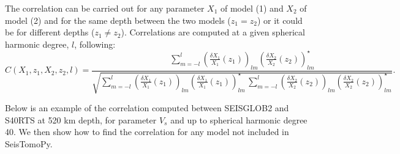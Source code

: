\documentclass[12pt]{article}
\begin{document}
The correlation can be carried out for any parameter \(X_1\) of model
(1) and \(X_2\) of model (2) and for the same depth between the two
models (\(z_1=z_2\)) or it could be for different depths
(\(z_1 \neq z_2\)). Correlations are computed at a given spherical
harmonic degree, \(l\), following:
\begin{equation}
    C(X_1,z_1,X_2,z_2,l) = \frac{\displaystyle \sum_{m=-l}^l  \left(\frac{\delta X_1}{X_1}(z_1)\right)_{lm}  \left(\frac{\delta X_2}{X_2}(z_2)\right)^\star_{lm}}{\sqrt{\displaystyle \sum_{m=-l}^l  \left(\frac{\delta X_1}{X_1}(z_1)\right)_{lm}  \left(\frac{\delta X_1}{X_1}(z_1)\right)^\star_{lm} \, \displaystyle \sum_{m=-l}^l  \left(\frac{\delta X_2}{X_2}(z_2)\right)_{lm}  \left(\frac{\delta X_2}{X_2}(z_2)\right)^\star_{lm}}}.
    \label{eq.Correlation}
\end{equation}

Below is an example of the correlation computed between SEISGLOB2 and S40RTS
 at 520 km depth, for parameter \(V_s\) and up to spherical
harmonic degree 40. We then  show how to find the correlation for any model not
included in SeisTomoPy.
\end{document}
